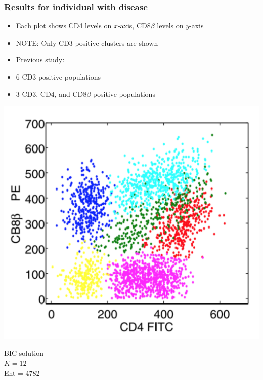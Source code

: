 \documentclass[mathserif,compress]{beamer}
\renewcommand\;{\,}
\begin{document}
\begin{frame}\frametitle{Results for individual with disease}
\begin{itemize}
\item[]
Each plot shows CD4 levels on $x$-axis, CD8$\beta$ levels on $y$-axis
\medskip
\item[]
\alert{NOTE}: Only CD3-positive clusters are shown
\end{itemize}
\begin{center}
\begin{minipage}{0.3\linewidth}
\begin{itemize}
\item[]
Previous study:
\\
\item[]
6 CD3 positive populations
\\
\item[]
3 CD3, CD4, and CD8$\beta$ positive populations
\end{itemize}
\end{minipage}
\hfill
\begin{minipage}{0.3\linewidth}
\includegraphics[width=\linewidth]{BIC_positive.png}
\begin{center}
BIC solution
\\
$K = 12$
\\
Ent = 4782
\end{center}
\end{minipage}
\hfill
\begin{minipage}{0.3\linewidth}

\end{minipage}
\end{center}
\end{frame}
\end{document}
